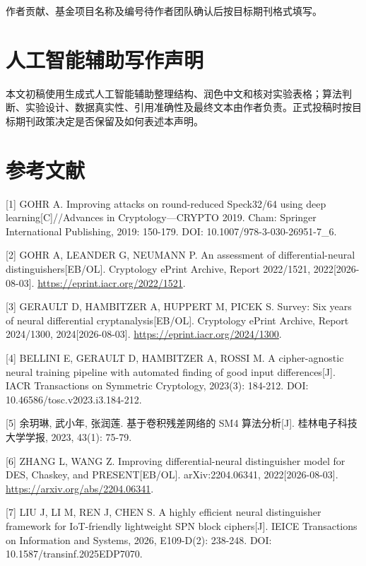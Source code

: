 \documentclass{templates/cjc-utf8}
\begin{document}
作者贡献、基金项目名称及编号待作者团队确认后按目标期刊格式填写。

\hypertarget{ux4ebaux5de5ux667aux80fdux8f85ux52a9ux5199ux4f5cux58f0ux660e}{%
\section{人工智能辅助写作声明}\label{ux4ebaux5de5ux667aux80fdux8f85ux52a9ux5199ux4f5cux58f0ux660e}}

本文初稿使用生成式人工智能辅助整理结构、润色中文和核对实验表格；算法判断、实验设计、数据真实性、引用准确性及最终文本由作者负责。正式投稿时按目标期刊政策决定是否保留及如何表述本声明。

\hypertarget{ux53c2ux8003ux6587ux732e}{%
\section{参考文献}\label{ux53c2ux8003ux6587ux732e}}

{[}1{]} GOHR A. Improving attacks on round-reduced Speck32/64 using deep
learning{[}C{]}//Advances in Cryptology---CRYPTO 2019. Cham: Springer
International Publishing, 2019: 150-179. DOI:
10.1007/978-3-030-26951-7\_6.

{[}2{]} GOHR A, LEANDER G, NEUMANN P. An assessment of
differential-neural distinguishers{[}EB/OL{]}. Cryptology ePrint
Archive, Report 2022/1521, 2022{[}2026-08-03{]}.
\url{https://eprint.iacr.org/2022/1521}.

{[}3{]} GERAULT D, HAMBITZER A, HUPPERT M, PICEK S. Survey: Six years of
neural differential cryptanalysis{[}EB/OL{]}. Cryptology ePrint Archive,
Report 2024/1300, 2024{[}2026-08-03{]}.
\url{https://eprint.iacr.org/2024/1300}.

{[}4{]} BELLINI E, GERAULT D, HAMBITZER A, ROSSI M. A cipher-agnostic
neural training pipeline with automated finding of good input
differences{[}J{]}. IACR Transactions on Symmetric Cryptology, 2023(3):
184-212. DOI: 10.46586/tosc.v2023.i3.184-212.

{[}5{]} 余玥琳, 武小年, 张润莲. 基于卷积残差网络的 SM4 算法分析{[}J{]}.
桂林电子科技大学学报, 2023, 43(1): 75-79.

{[}6{]} ZHANG L, WANG Z. Improving differential-neural distinguisher
model for DES, Chaskey, and PRESENT{[}EB/OL{]}. arXiv:2204.06341,
2022{[}2026-08-03{]}. \url{https://arxiv.org/abs/2204.06341}.

{[}7{]} LIU J, LI M, REN J, CHEN S. A highly efficient neural
distinguisher framework for IoT-friendly lightweight SPN block
ciphers{[}J{]}. IEICE Transactions on Information and Systems, 2026,
E109-D(2): 238-248. DOI: 10.1587/transinf.2025EDP7070.
\end{document}
